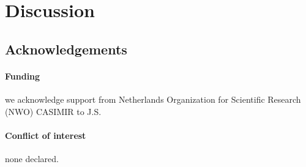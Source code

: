 \documentclass{bioinfo}
\begin{document}
\section{Discussion}


\subsection*{Acknowledgements}
\paragraph*{Funding\textcolon} we acknowledge support from Netherlands Organization for Scientific Research (NWO) CASIMIR to J.S.
\paragraph*{Conflict of interest\textcolon} none declared.




{\scriptsize

}






\end{document}

